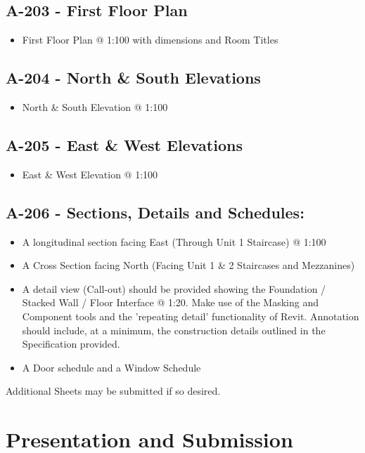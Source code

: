 \subsection*{A-203 - First Floor Plan}
\begin{itemize}
	\item First Floor Plan @ 1:100 with dimensions and Room Titles
\end{itemize}



\subsection*{A-204 - North \& South Elevations}
\begin{itemize}
	\item North \& South Elevation @ 1:100
\end{itemize}

\subsection*{A-205 - East \& West Elevations}
\begin{itemize}
	\item East \& West Elevation @ 1:100
\end{itemize}

\subsection*{A-206 - Sections, Details and Schedules:}
\begin{itemize}
	\item A longitudinal section facing East (Through Unit 1 Staircase) @ 1:100
	\item A Cross Section facing North (Facing Unit 1 \& 2 Staircases and Mezzanines)
	\item A detail view (Call-out) should be provided showing the Foundation / Stacked Wall / Floor Interface @ 1:20.  Make use of the Masking and Component tools and the 'repeating detail' functionality of Revit.  Annotation should include, at a minimum, the construction details outlined in the Specification provided.
	\item A Door schedule and a Window Schedule
\end{itemize}

Additional Sheets may be submitted if so desired.




\newpage
\section*{Presentation and Submission}

